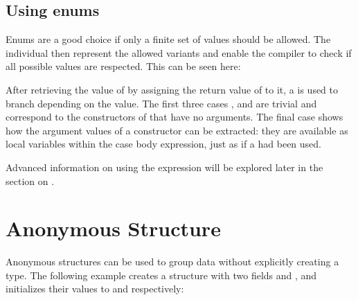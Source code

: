 


\subsection{Using enums}
\label{types-enum-using}

Enums are a good choice if only a finite set of values should be allowed. The individual  then represent the allowed variants and enable the compiler to check if all possible values are respected. This can be seen here:


After retrieving the value of  by assigning the return value of  to it, a  is used to branch depending on the value. The first three cases ,  and  are trivial and correspond to the constructors of  that have no arguments. The final case  shows how the argument values of a constructor can be extracted: they are available as local variables within the case body expression, just as if a  had been used.

Advanced information on using the  expression will be explored later in the section on .


\section{Anonymous Structure}
\label{types-anonymous-structure}

Anonymous structures can be used to group data without explicitly creating a type. The following example creates a structure with two fields  and , and initializes their values to  and  respectively:

